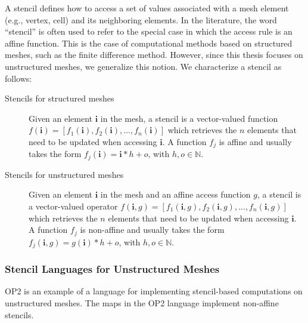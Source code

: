 A stencil defines how to access a set of values associated with a mesh element (e.g., vertex, cell) and its neighboring elements. In the literature, the word ``stencil'' is often used to refer to the special case in which the access rule is an affine function. This is the case of computational methods based on structured meshes, such as the finite difference method. However, since this thesis focuses on unstructured meshes, we generalize this notion. We characterize a stencil as follows:

\begin{description}
\item[Stencils for structured meshes] Given an element $\boldsymbol{i}$ in the mesh, a stencil is a vector-valued function $f(\boldsymbol{i}) = [f_1(\boldsymbol{i}), f_2(\boldsymbol{i}), ..., f_n(\boldsymbol{i})]$ which retrieves the $n$ elements that need to be updated when accessing $\boldsymbol{i}$. A function $f_j$ is affine and usually takes the form $f_j(\boldsymbol{i}) = \boldsymbol{i}*h + o$, with $h, o \in \mathbb{N}$.
\item[Stencils for unstructured meshes] Given an element $\boldsymbol{i}$ in the mesh and an affine access function $g$, a stencil is a vector-valued operator $f(\boldsymbol{i}, g) = [f_1(\boldsymbol{i}, g), f_2(\boldsymbol{i}, g), ..., f_n(\boldsymbol{i}, g)]$ which retrieves the $n$ elements that need to be updated when accessing $\boldsymbol{i}$. A function $f_j$ is non-affine and usually takes the form $f_j(\boldsymbol{i}, g) = g(\boldsymbol{i})*h + o$, with $h, o \in \mathbb{N}$.
\end{description}

\subsubsection{Stencil Languages for Unstructured Meshes}
OP2 is an example of a language for implementing stencil-based computations on unstructured meshes. The maps in the OP2 language implement non-affine stencils. 


